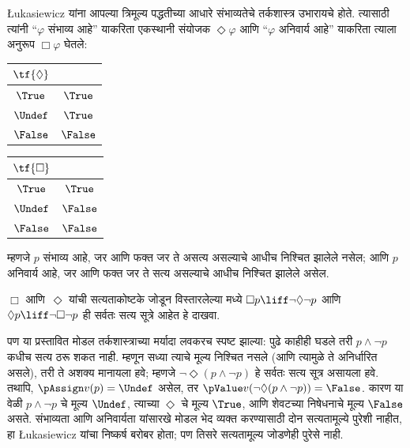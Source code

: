 \L ukasiewicz यांना आपल्या त्रिमूल्य पद्धतीच्या आधारे
संभाव्यतेचे तर्कशास्त्र उभारायचे होते. त्यासाठी त्यांनी ``$\varphi$
संभाव्य आहे'' याकरिता एकस्थानी संयोजक $\Diamond \varphi$ आणि
``$\varphi$ अनिवार्य आहे'' याकरिता त्याला अनुरूप $\Box \varphi$ घेतले:
\begin{center}
  \begin{tabular}{c|c}
    $\tf{\Diamond}$ & \\
    \hline
    $\True$ & $\True$ \\
    $\Undef$ & $\True$ \\
    $\False$ & $\False$
  \end{tabular}
  \quad
  \begin{tabular}{c|c}
    $\tf{\Box}$ & \\
    \hline
    $\True$ & $\True$ \\
    $\Undef$ & $\False$ \\
    $\False$ & $\False$
  \end{tabular}
\end{center}
म्हणजे $p$ संभाव्य आहे, जर आणि फक्त जर ते असत्य असल्याचे
आधीच निश्चित झालेले नसेल; आणि $p$ अनिवार्य आहे, जर आणि
फक्त जर ते सत्य असल्याचे आधीच निश्चित झालेले असेल.

\begin{prob}
  $\Box$ आणि~$\Diamond$ यांची सत्यताकोष्टके जोडून विस्तारलेल्या
  \LogLuk[3] मध्ये $\Box p \liff \lnot\Diamond \lnot p$ आणि
  $\Diamond p \liff \lnot \Box \lnot p$ ही सर्वतः सत्य सूत्रे
  आहेत हे दाखवा.
\end{prob}

पण या प्रस्तावित मोडल तर्कशास्त्राच्या मर्यादा लवकरच स्पष्ट
झाल्या: पुढे काहीही घडले तरी $p \land \lnot p$ कधीच सत्य
ठरू शकत नाही. म्हणून सध्या त्याचे मूल्य निश्चित नसले
(आणि त्यामुळे ते अनिर्धारित असले), तरी ते अशक्य मानायला
हवे; म्हणजे $\lnot \Diamond(p \land \lnot p)$ हे सर्वतः सत्य
सूत्र असायला हवे. तथापि, $\pAssign v(p) = \Undef$ असेल,
तर $\pValue v(\lnot \Diamond(p \land \lnot p)) = \False$.
कारण या वेळी $p \land \lnot p$ चे मूल्य $\Undef$,
त्याच्या $\Diamond$ चे मूल्य $\True$, आणि शेवटच्या निषेधनाचे
मूल्य $\False$ असते.
संभाव्यता आणि अनिवार्यता यांसारखे मोडल भेद व्यक्त करण्यासाठी
दोन सत्यतामूल्ये पुरेशी नाहीत, हा \L ukasiewicz यांचा निष्कर्ष
बरोबर होता; पण तिसरे सत्यतामूल्य जोडणेही पुरेसे नाही.













